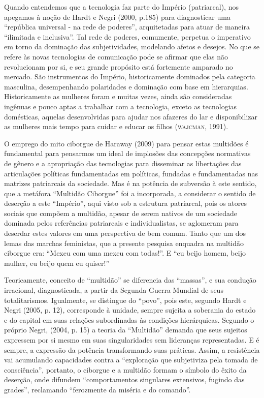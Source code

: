 Quando entendemos que a tecnologia faz parte do Império (patriarcal),
nos apegamos à noção de Hardt e Negri (2000, p.185) para diagnosticar
uma ``república universal - na rede de poderes'', arquitetadas para
atuar de maneira ``ilimitada e inclusiva''. Tal rede de poderes,
comumente, perpetua o imperativo em torno da dominação das
subjetividades, modelando afetos e desejos. No que se refere às novas
tecnologias de comunicação pode se afirmar que elas não revolucionam por
si, e seu grande propósito está fortemente amparado no mercado. São
instrumentos do Império, historicamente dominados pela categoria
masculina, desempenhando polaridades e dominação com base em
hierarquias. Historicamente as mulheres foram e muitas vezes, ainda são
consideradas ingênuas e pouco aptas a trabalhar com a tecnologia, exceto
as tecnologias domésticas, aquelas desenvolvidas para ajudar nos
afazeres do lar e disponibilizar as mulheres mais tempo para cuidar e
educar os filhos (\textsc{wajcman}, 1991).

O emprego do mito ciborgue de Haraway (2009) para pensar estas multidões
é fundamental para pensarmos um ideal de implosões das concepções
normativas de gênero e a apropriação das tecnologias para disseminar as
libertações das articulações políticas fundamentadas em políticas,
fundadas e fundamentadas nas matrizes patriarcais da sociedade. Mas é na
potência de subversão à este sentido, que a metáfora ``Multidão
Ciborgue'' foi a incorporada, a considerar o sentido de deserção a este
``Império'', aqui visto sob a estrutura patriarcal, pois os atores
sociais que compõem a multidão, apesar de serem nativos de um sociedade
dominada pelos referências patriarcais e individualistas, se aglomeram
para deserdar estes valores em uma perspectiva de bem comum. Tanto que
um dos lemas das marchas feministas, que a presente pesquisa enquadra na
multidão ciborgue era: ``Mexeu com uma mexeu com todas!''. E ``eu beijo
homem, beijo mulher, eu beijo quem eu quiser!''

Teoricamente, conceito de ``multidão'' se diferencia das ``massas'', e
sua condução irracional, diagnosticada, a partir da Segunda Guerra
Mundial de seus totalitarismos. Igualmente, se distingue do ``povo'',
pois este, segundo Hardt e Negri (2005, p. 12), corresponde à unidade,
sempre sujeita a soberania do estado e do capital em suas relações
subordinadas às condições hierárquicas. Segundo o próprio Negri, (2004,
p. 15) a teoria da ``Multidão'' demanda que seus sujeitos expressem por
si mesmo em suas singularidades sem lideranças representadas. E é
sempre, a expressão da potência transformando suas práticas. Assim, a
resistência vai acumulando capacidades contra a ``exploração que
subjetiviza pela tomada de consciência'', portanto, o ciborgue e a
multidão formam o símbolo do êxito da deserção, onde difundem
``comportamentos singulares extensivos, fugindo das grades'', reclamando
``ferozmente da miséria e do comando''.

